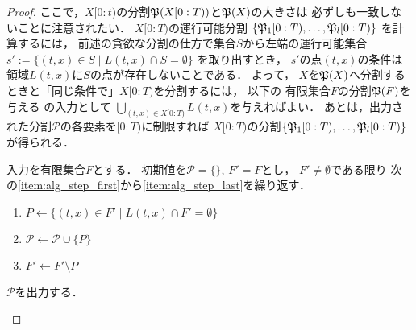 \begin{proof}
  ここで，$X[0:t)$の分割$\mathfrak{P}(X[0:T))$と$\mathfrak{P}(X)$の大きさは
  必ずしも一致しないことに注意されたい．
  $X[0:T)$の運行可能分割
  $\{ \mathfrak{P}_1[0:T), \ldots, \mathfrak{P}_l[0:T) \}$
  を計算するには，
  前述の貪欲な分割の仕方で集合$S$から左端の運行可能集合
  $s' := \{ (t, x) \in S \mid L(t, x) \cap S = \emptyset \}$
  を取り出すとき，
  $s'$の点$(t, x)$の条件は領域$L(t, x)$に$S$の点が存在しないことである．
  よって，
  $X$を$\mathfrak{P}(X)$へ分割するときと「同じ条件で」$X[0:T)$を分割するには，
  以下の
  有限集合$F$の分割$\mathfrak{P}(F)$を与える{\setPartitionAlgorithm}
  の入力として
  $\bigcup_{(t, x) \in X[0:T)} L(t, x)$を与えればよい．
  あとは，出力された分割$\mathcal{P}$の各要素を$[0:T)$に制限すれば
  $X[0:T)$の分割$\{ \mathfrak{P}_1[0:T), \ldots, \mathfrak{P}_l[0:T) \}$が得られる．

  \begin{setPartitionAlgorithmForTimeSpecifiedProblemOnLine}
    入力を有限集合$F$とする．
    初期値を$\mathcal{P} = \{\}$, $F' = F$とし，
    $F' \neq \emptyset$である限り
    次の\ref{item:alg_step_first}から\ref{item:alg_step_last}を繰り返す．
    \begin{enumerate}
    \item \label{item:alg_step_first}
      $P \gets \{ (t, x) \in F' \mid L(t, x) \cap F' = \emptyset \}$
    \item
      $\mathcal{P} \gets \mathcal{P} \cup \{ P \}$
    \item \label{item:alg_step_last}
      $F' \gets F' \setminus P$
    \end{enumerate}
    $\mathcal{P}$を出力する．
  \end{setPartitionAlgorithmForTimeSpecifiedProblemOnLine}

\end{proof}
